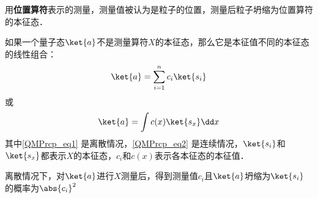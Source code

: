\begin{example}{}
用\textbf{位置算符}表示的测量，测量值被认为是粒子的位置，测量后粒子坍缩为位置算符的本征态．
\end{example}

如果一个量子态$\ket{a}$不是测量算符$X$的本征态，那么它是本征值不同的本征态的线性组合：
\begin{equation}\label{QMPrcp_eq1}
\ket{a} = \sum_{i=1}^{n} c_i\ket{s_i}
\end{equation}
或
\begin{equation}\label{QMPrcp_eq2}
\ket{a} = \int c(x)\ket{s_x}\dd x
\end{equation}
其中\autoref{QMPrcp_eq1} 是离散情况，\autoref{QMPrcp_eq2} 是连续情况，$\ket{s_i}$和$\ket{s_x}$都表示$X$的本征态，$c_i$和$c(x)$表示各本征态的本征值．

离散情况下，对$\ket{a}$进行$X$测量后，得到测量值$c_i$且$\ket{a}$坍缩为$\ket{s_i}$的概率为$\abs{c_i}^2$

